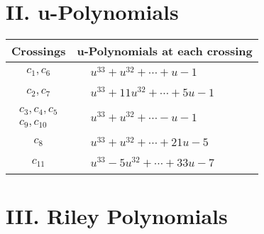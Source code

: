 \documentclass[1p]{elsarticle_modified}
\theoremstyle{definition}
\begin{document}
\newpage\renewcommand{\arraystretch}{1}
\centering \section*{ II. u-Polynomials}
\begin{tabular}{m{50pt}|m{274pt}}
Crossings & \hspace{64pt}u-Polynomials at each crossing \\
\hline $$\begin{aligned}c_{1},c_{6}\end{aligned}$$&$\begin{aligned}
&u^{33}+u^{32}+\cdots+u-1
\end{aligned}$\\
\hline $$\begin{aligned}c_{2},c_{7}\end{aligned}$$&$\begin{aligned}
&u^{33}+11 u^{32}+\cdots+5 u-1
\end{aligned}$\\
\hline $$\begin{aligned}c_{3},c_{4},c_{5}\\c_{9},c_{10}\end{aligned}$$&$\begin{aligned}
&u^{33}+u^{32}+\cdots- u-1
\end{aligned}$\\
\hline $$\begin{aligned}c_{8}\end{aligned}$$&$\begin{aligned}
&u^{33}+u^{32}+\cdots+21 u-5
\end{aligned}$\\
\hline $$\begin{aligned}c_{11}\end{aligned}$$&$\begin{aligned}
&u^{33}-5 u^{32}+\cdots+33 u-7
\end{aligned}$\\
\hline
\end{tabular}\newpage\renewcommand{\arraystretch}{1}
\centering \section*{ III. Riley Polynomials}
\end{document}

